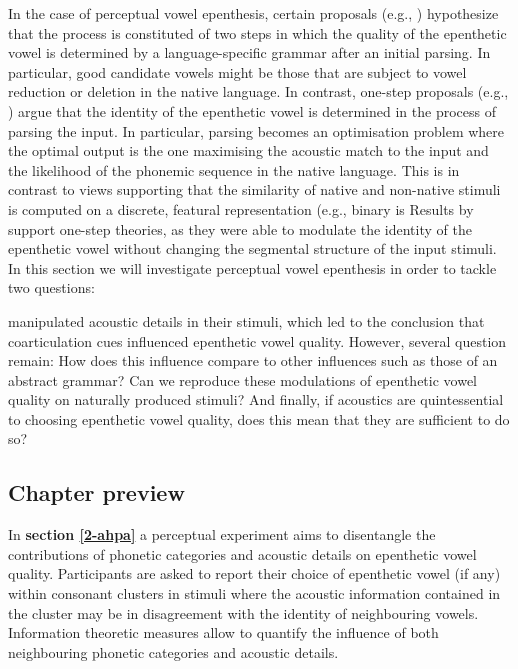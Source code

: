 {In the case of perceptual vowel epenthesis, certain proposals (e.g., \cite{berent2007, monahan2009}) hypothesize that the process is constituted of two steps in which the quality of the epenthetic vowel is determined by a language-specific grammar after an initial parsing. In particular, good candidate vowels might be those that are subject to vowel reduction or deletion in the native language.  
In contrast, one-step proposals (e.g., \cite{dupoux2011}) argue that the identity of the epenthetic vowel is determined in the process of parsing the input. In particular, parsing becomes an optimisation problem where the optimal output is the one maximising the acoustic match to the input and the likelihood of the phonemic sequence in the native language.
This is in contrast to views supporting that the similarity of native and non-native stimuli is computed on a discrete, featural representation (e.g., binary is Results by \cite{dupoux2011} support one-step theories, as they were able to modulate the identity of the epenthetic vowel without changing the segmental structure of the input stimuli. \\

In this section we will investigate perceptual vowel epenthesis in order to tackle two questions: 

\cite{dupoux2011} manipulated acoustic details in their stimuli, which led to the conclusion that coarticulation cues influenced epenthetic vowel quality. However, several question remain: How does this influence compare to other influences such as those of an abstract grammar? Can we reproduce these modulations of epenthetic vowel quality on naturally produced stimuli? And finally, if acoustics are quintessential to choosing epenthetic vowel quality, does this mean that they are sufficient to do so? \\

\subsection{Chapter preview}

In \textbf{section \ref{2-ahpa}} a perceptual experiment aims to disentangle the contributions of phonetic categories and acoustic details on epenthetic vowel quality. Participants are asked to report their choice of epenthetic vowel (if any) within consonant clusters in stimuli where the acoustic information contained in the cluster may be in disagreement with the identity of neighbouring vowels. Information theoretic measures allow to quantify the influence of both neighbouring phonetic categories and acoustic details.  \\

}
